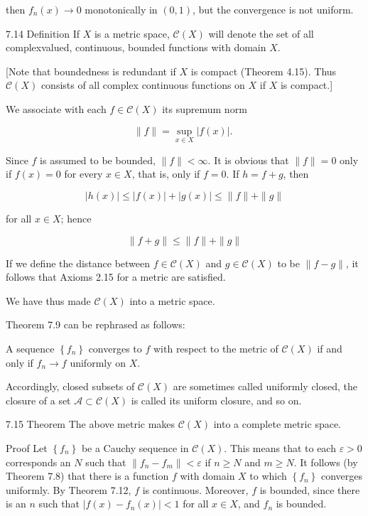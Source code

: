 \documentclass[10pt]{article}
\begin{document}
then $f_{n}(x) \rightarrow 0$ monotonically in $(0,1)$, but the convergence is not uniform.

7.14 Definition If $X$ is a metric space, $\mathscr{C}(X)$ will denote the set of all complexvalued, continuous, bounded functions with domain $X$.

[Note that boundedness is redundant if $X$ is compact (Theorem 4.15). Thus $\mathscr{C}(X)$ consists of all complex continuous functions on $X$ if $X$ is compact.]

We associate with each $f \in \mathscr{C}(X)$ its supremum norm

$$
\|f\|=\sup _{x \in X}|f(x)| \text {. }
$$

Since $f$ is assumed to be bounded, $\|f\|<\infty$. It is obvious that $\|f\|=0$ only if $f(x)=0$ for every $x \in X$, that is, only if $f=0$. If $h=f+g$, then

$$
|h(x)| \leq|f(x)|+|g(x)| \leq\|f\|+\|g\|
$$

for all $x \in X$; hence

$$
\|f+g\| \leq\|f\|+\|g\|
$$

If we define the distance between $f \in \mathscr{C}(X)$ and $g \in \mathscr{C}(X)$ to be $\|f-g\|$, it follows that Axioms 2.15 for a metric are satisfied.

We have thus made $\mathscr{C}(X)$ into a metric space.

Theorem 7.9 can be rephrased as follows:

A sequence $\left\{f_{n}\right\}$ converges to $f$ with respect to the metric of $\mathscr{C}(X)$ if and only if $f_{n} \rightarrow f$ uniformly on $X$.

Accordingly, closed subsets of $\mathscr{C}(X)$ are sometimes called uniformly closed, the closure of a set $\mathscr{A} \subset \mathscr{C}(X)$ is called its uniform closure, and so on.

7.15 Theorem The above metric makes $\mathscr{C}(X)$ into a complete metric space.

Proof Let $\left\{f_{n}\right\}$ be a Cauchy sequence in $\mathscr{C}(X)$. This means that to each $\varepsilon>0$ corresponds an $N$ such that $\left\|f_{n}-f_{m}\right\|<\varepsilon$ if $n \geq N$ and $m \geq N$. It follows (by Theorem 7.8) that there is a function $f$ with domain $X$ to which $\left\{f_{n}\right\}$ converges uniformly. By Theorem 7.12, $f$ is continuous. Moreover, $f$ is bounded, since there is an $n$ such that $\left|f(x)-f_{n}(x)\right|<1$ for all $x \in X$, and $f_{n}$ is bounded.
\end{document}
